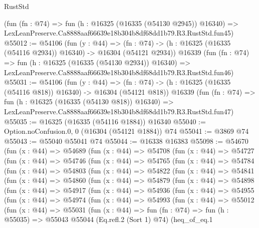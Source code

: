 \begin{lexlean}{RustStd}
\begin{coremodule}
    (fun (fn : @74) =>
    fun (h : @16325 (@16335 (@54130 @2945)) @16340) =>
    LexLeanPreserve.Ca8888aaf66639e18b304b8df68dd1b79.R3.RustStd.fun45)
@55012 := @54106
    (fun (y : @44) =>
    (fn : @74) -> (h : @16325 (@16335 (@54116 @2934)) @16340) -> @16304 (@54121 @2934))
    @16339
    (fun (fn : @74) =>
    fun (h : @16325 (@16335 (@54130 @2934)) @16340) =>
    LexLeanPreserve.Ca8888aaf66639e18b304b8df68dd1b79.R3.RustStd.fun46)
@55031 := @54106
    (fun (y : @44) =>
    (fn : @74) -> (h : @16325 (@16335 (@54116 @818)) @16340) -> @16304 (@54121 @818))
    @16339
    (fun (fn : @74) =>
    fun (h : @16325 (@16335 (@54130 @818)) @16340) =>
    LexLeanPreserve.Ca8888aaf66639e18b304b8df68dd1b79.R3.RustStd.fun47)
@55035 := @16325 (@16335 (@54116 @1884)) @16340
@55040 := Option.noConfusion.{0, 0} (@16304 (@54121 @1884)) @74
@55041 := @3869 @74
@55043 := @55040 @55041 @74
@55044 := @16338 @16383
@55098 := @54670
    (fun (x : @44) =>
    @54689
      (fun (x : @44) =>
      @54708
        (fun (x : @44) =>
        @54727
          (fun (x : @44) =>
          @54746
            (fun (x : @44) =>
            @54765
              (fun (x : @44) =>
              @54784
                (fun (x : @44) =>
                @54803
                  (fun (x : @44) =>
                  @54822
                    (fun (x : @44) =>
                    @54841
                      (fun (x : @44) =>
                      @54860
                        (fun (x : @44) =>
                        @54879
                          (fun (x : @44) =>
                          @54898
                            (fun (x : @44) =>
                            @54917
                              (fun (x : @44) =>
                              @54936
                                (fun (x : @44) =>
                                @54955
                                  (fun (x : @44) =>
                                  @54974
                                    (fun (x : @44) =>
                                    @54993
                                      (fun (x : @44) =>
                                      @55012
                                        (fun (x : @44) =>
                                        @55031
                                          (fun (x : @44) =>
                                          fun (fn : @74) =>
                                          fun (h : @55035) =>
                                          @55043
                                            @55044
                                            (Eq.refl.{2} (Sort 1) @74)
                                            (heq_of_eq.{1}

\end{coremodule}
\end{lexlean}

